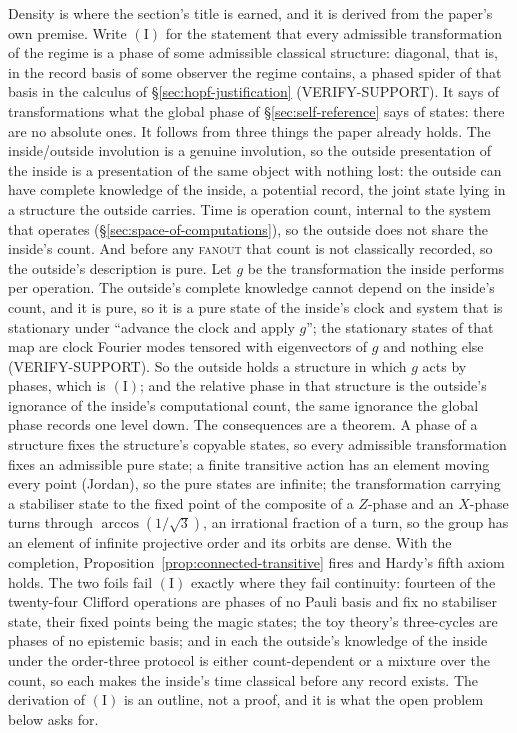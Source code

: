 Density is where the section's title is earned, and it is derived from the paper's own premise.
Write $(\mathrm{I})$ for the statement that every admissible transformation of the regime is a
phase of some admissible classical structure: diagonal, that is, in the record basis of some
observer the regime contains, a phased spider of that basis in the calculus of
\S\ref{sec:hopf-justification} \autocite{coeckeduncan2011interacting} (VERIFY-SUPPORT). It says
of transformations what the global phase of \S\ref{sec:self-reference} says of states: there are
no absolute ones. It follows from three things the paper already holds. The inside/outside
involution is a genuine involution, so the outside presentation of the inside is a presentation
of the same object with nothing lost: the outside can have complete knowledge of the inside, a
potential record, the joint state lying in a structure the outside carries. Time is operation
count, internal to the system that operates (\S\ref{sec:space-of-computations}), so the outside
does not share the inside's count. And before any \textsc{fanout} that count is not classically
recorded, so the outside's description is pure. Let $g$ be the transformation the inside
performs per operation. The outside's complete knowledge cannot depend on the inside's count,
and it is pure, so it is a pure state of the inside's clock and system that is stationary under
``advance the clock and apply $g$''; the stationary states of that map are clock Fourier modes
tensored with eigenvectors of $g$ and nothing else \autocite{pagewootters1983evolution}
(VERIFY-SUPPORT). So the outside holds a structure in which $g$ acts by phases, which is
$(\mathrm{I})$; and the relative phase in that structure is the outside's ignorance of the
inside's computational count, the same ignorance the global phase records one level down. The
consequences are a theorem. A phase of a structure fixes the structure's copyable states, so
every admissible transformation fixes an admissible pure state; a finite transitive action has
an element moving every point (Jordan), so the pure states are infinite; the transformation
carrying a stabiliser state to the fixed point of the composite of a $Z$-phase and an $X$-phase
turns through $\arccos(1/\sqrt{3})$, an irrational fraction of a turn, so the group has an
element of infinite projective order and its orbits are dense. With the completion,
Proposition~\ref{prop:connected-transitive} fires and Hardy's fifth axiom holds. The two foils
fail $(\mathrm{I})$ exactly where they fail continuity: fourteen of the twenty-four Clifford
operations are phases of no Pauli basis and fix no stabiliser state, their fixed points being
the magic states; the toy theory's three-cycles are phases of no epistemic basis; and in each
the outside's knowledge of the inside under the order-three protocol is either count-dependent
or a mixture over the count, so each makes the inside's time classical before any record exists.
The derivation of $(\mathrm{I})$ is an outline, not a proof, and it is what the open problem
below asks for.

